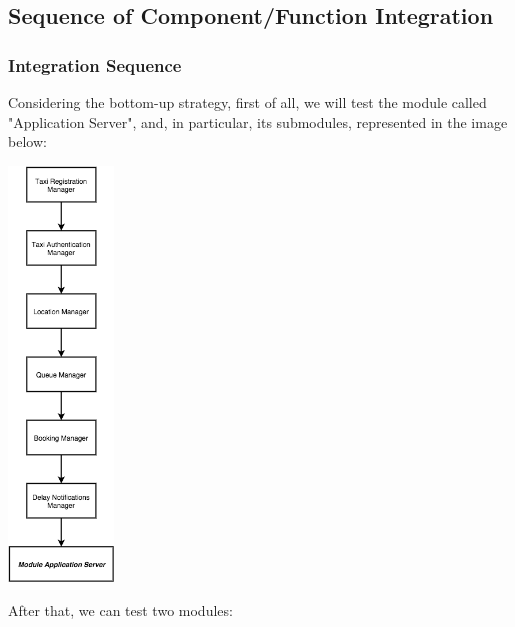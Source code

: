 \subsection{Sequence of Component/Function Integration}
\subsubsection{Integration Sequence}
Considering the bottom-up strategy, first of all, we will test the module called "Application Server", and, in particular, its submodules, represented in the image below:
    \begin{center}
	    \includegraphics[width=0.21\textwidth]{./images/ModuleApplicationServer.png}~\\[1.5cm] 
    \end{center}	
After that, we can test two modules:
